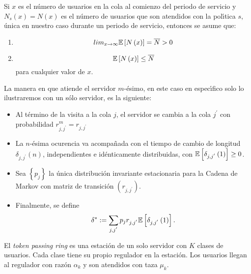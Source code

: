 Si $x$ es el n{\'u}mero de usuarios en la cola al comienzo del
periodo de servicio y $N_{s}\left(x\right)=N\left(x\right)$ es el
n{\'u}mero de usuarios que son atendidos con la pol{\'\i}tica $s$,
{\'u}nica en nuestro caso durante un periodo de servicio, entonces
se asume que:
\begin{enumerate}
\item
\begin{equation}\label{S1}
lim_{x\rightarrow\infty}\mathbb{E}\left[N\left(x\right)\right]=\overline{N}>0
\end{equation}
\item
\begin{equation}\label{S2}
\mathbb{E}\left[N\left(x\right)\right]\leq \overline{N} \end{equation}
para cualquier valor de $x$.
\end{enumerate}
La manera en que atiende el servidor $m$-{\'e}simo, en este caso
en espec{\'\i}fico solo lo ilustraremos con un s{\'o}lo servidor,
es la siguiente:
\begin{itemize}
\item Al t{\'e}rmino de la visita a la cola $j$, el servidor se
cambia a la cola $j^{'}$ con probabilidad
$r_{j,j^{'}}^{m}=r_{j,j^{'}}$

\item La $n$-{\'e}sima ocurencia va acompa{\~n}ada con el tiempo
de cambio de longitud $\delta_{j,j^{'}}\left(n\right)$,
independientes e id{\'e}nticamente distribuidas, con
$\mathbb{E}\left[\delta_{j,j^{'}}\left(1\right)\right]\geq0$.

\item Sea $\left\{p_{j}\right\}$ la {\'u}nica distribuci{\'o}n
invariante estacionaria para la Cadena de Markov con matriz de
transici{\'o}n $\left(r_{j,j^{'}}\right)$.

\item Finalmente, se define
\begin{equation}
\delta^{*}:=\sum_{j,j^{'}}p_{j}r_{j,j^{'}}\mathbb{E}\left[\delta_{j,j^{'}}\left(1\right)\right].
\end{equation}
\end{itemize}
El {\em token passing ring} es una estaci\'on de un solo servidor
con $K$ clases de usuarios. Cada clase tiene su propio regulador
en la estaci\'on. Los usuarios llegan al regulador con raz\'on
$\alpha_{k}$ y son atendidos con taza $\mu_{k}$.

